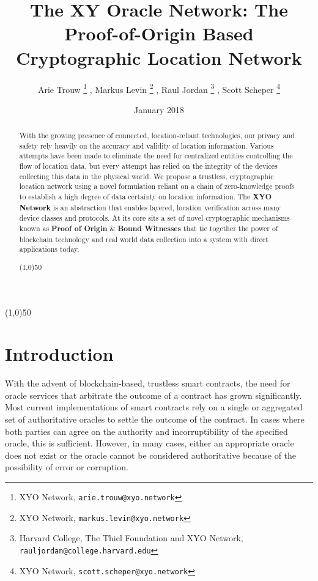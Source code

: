 \documentclass{article}
\title {The XY Oracle Network: The Proof-of-Origin Based Cryptographic Location Network}
\author{
    Arie Trouw
        \thanks{XYO Network, \texttt{arie.trouw@xyo.network}}
    , Markus Levin
        \thanks{XYO Network, \texttt{markus.levin@xyo.network}}
    , Raul Jordan
        \thanks{Harvard College, The Thiel Foundation and XYO Network, \texttt{rauljordan@college.harvard.edu}}
    , Scott Scheper
        \thanks{XYO Network, \texttt{scott.scheper@xyo.network}}
}
\date{January 2018}
\begin{document}
\maketitle

\begin{center}
\line(1,0){50}
\end{center}

\begin{abstract}
With the growing presence of connected, location-reliant technologies, our privacy and safety rely heavily on the accuracy and validity of location information. Various attempts have been made to eliminate the need for centralized entities controlling the flow of location data, but every attempt has relied on the integrity of the devices collecting this data in the physical world.
We propose a trustless, cryptographic location network using a novel formulation reliant on a chain of zero-knowledge proofs to establish a high degree of data certainty on location information.
The \textbf{XYO Network} is an abstraction that enables layered, location verification across many device classes and protocols. At its core sits a set of novel cryptographic mechanisms known as \textbf{Proof of Origin} \& \textbf{Bound Witnesses} that tie together the power of blockchain technology and real world data collection into a system with direct applications today.

\begin{center}
\line(1,0){50}
\end{center}
\end{abstract}

\section{Introduction}
With the advent of blockchain-based, trustless smart contracts, the need for oracle services
that arbitrate the outcome of a contract has grown significantly. Most current implementations
of smart contracts rely on a single or aggregated set of authoritative oracles to settle
the outcome of the contract. In cases where both parties can agree on the authority and
incorruptibility of the specified oracle, this is sufficient. However, in many cases, either
an appropriate oracle does not exist or the oracle cannot be considered
authoritative because of the possibility of error or corruption.
\end{document}
